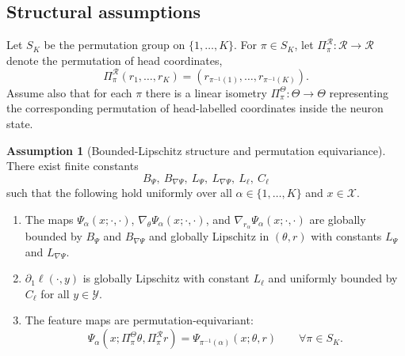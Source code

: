 \documentclass[11pt]{article}
\theoremstyle{definition}
\newtheorem{assumption}[theorem]{Assumption}
\begin{document}
\subsection{Structural assumptions}

Let $S_K$ be the permutation group on $\{1,\dots,K\}$. For $\pi\in S_K$, let $\Pi_\pi^\mathcal R:\mathcal R\to\mathcal R$ denote the permutation of head coordinates,
\[
  \Pi_\pi^\mathcal R(r_1,\dots,r_K)
  =
  (r_{\pi^{-1}(1)},\dots,r_{\pi^{-1}(K)}).
\]
Assume also that for each $\pi$ there is a linear isometry $\Pi_\pi^\Theta:\Theta\to\Theta$ representing the corresponding permutation of head-labelled coordinates inside the neuron state.

\begin{assumption}[Bounded-Lipschitz structure and permutation equivariance]
\label{ass:main}
There exist finite constants
\[
  B_\Psi,\ B_{\nabla\Psi},\ L_\Psi,\ L_{\nabla\Psi},\ L_\ell,\ C_\ell
\]
such that the following hold uniformly over all $\alpha\in\{1,\dots,K\}$ and $x\in\mathcal X$.
\begin{enumerate}[label=(\roman*),leftmargin=2em]
  \item The maps $\Psi_\alpha(x;\cdot,\cdot)$, $\nabla_\theta \Psi_\alpha(x;\cdot,\cdot)$, and $\nabla_{r_\alpha}\Psi_\alpha(x;\cdot,\cdot)$ are globally bounded by $B_\Psi$ and $B_{\nabla\Psi}$ and globally Lipschitz in $(\theta,r)$ with constants $L_\Psi$ and $L_{\nabla\Psi}$.
  \item $\partial_1\ell(\cdot,y)$ is globally Lipschitz with constant $L_\ell$ and uniformly bounded by $C_\ell$ for all $y\in\mathcal Y$.
  \item The feature maps are permutation-equivariant:
  \begin{equation}
    \Psi_\alpha(x;\Pi_\pi^\Theta\theta,\Pi_\pi^\mathcal R r)
    =
    \Psi_{\pi^{-1}(\alpha)}(x;\theta,r)
    \qquad
    \forall \pi\in S_K.
    \label{eq:equiv}
  \end{equation}
\end{enumerate}
\end{assumption}
\end{document}
